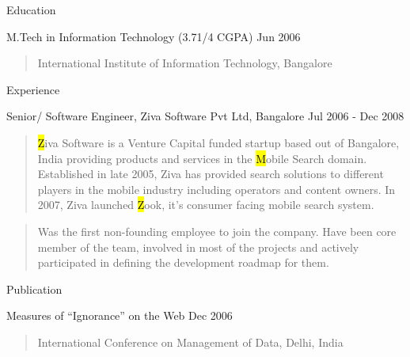 \documentclass{resume}
\author{Siddhartha Reddy Kothakapu}
\begin{document}
 \maketitle

\begin{category}{Education}{}

    \item {\topic M.Tech in Information Technology}
        {\footnotesize(3.71/4 CGPA)}
        {\period Jun 2006}
        \begin{quote}
            International Institute of Information Technology, Bangalore
        \end{quote}

\end{category}


\begin{category}{Experience}{}

    \item {\topic Senior/ Software Engineer,} Ziva Software Pvt Ltd, Bangalore
        {\period Jul 2006 - Dec 2008}
        \begin{quote}
            {\hl Ziva Software} is a Venture Capital funded startup based out
            of Bangalore, India providing products and services in the {\hl
            Mobile Search} domain. Established in late 2005, Ziva has provided
            search solutions to different players in the mobile industry
            including operators and content owners. In 2007, Ziva launched {\hl
            Zook}, it's consumer facing mobile search system.
        \end{quote}
        \begin{quote}
            Was the first non-founding employee to join the company. Have been core
            member of the team, involved in most of the projects and actively
            participated in defining the development roadmap for them.
        \end{quote}

\end{category}


\begin{category}{Publication}{}

    \item {\topic Measures of ``Ignorance'' on the Web}
        {\period Dec 2006}
        \begin{quote}
            International Conference on Management of Data, Delhi, India
        \end{quote}

\end{category}
\end{document}
